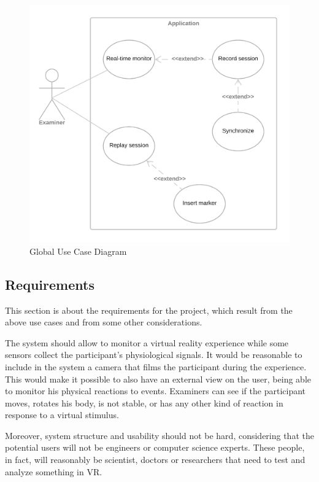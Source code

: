 \documentclass[binding=0.6cm,LaM]{sapthesis}
\begin{document}
\begin{figure}[h]
\centering
\includegraphics[scale=.257]{images/use_case}
\caption{Global Use Case Diagram}
\end{figure}


\subsection{Requirements}
This section is about the requirements for the project, which result from the above use cases and from some other considerations. 

The system should allow to monitor a virtual reality experience while some sensors collect the participant's physiological signals. It would be reasonable to include in the system a camera that films the participant during the experience. This would make it possible to also have an external view on the user, being able to monitor his physical reactions to events. Examiners can see if the participant moves, rotates his body, is not stable, or has any other kind of reaction in response to a virtual stimulus.

Moreover, system structure and usability should not be hard, considering that the potential users will not be engineers or computer science experts. These people, in fact, will reasonably be scientist, doctors or researchers that need to test and analyze something in VR. 
\end{document}
